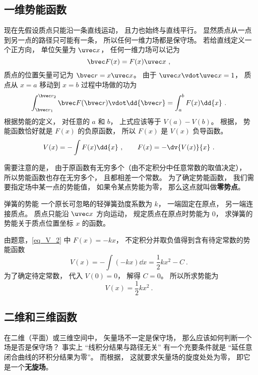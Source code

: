 \subsection{一维势能函数}

现在先假设质点只能沿一条直线运动， 且力也始终与直线平行。 显然质点从一点到另一点的路径只可能有一条， 所以任何一维力场都是保守场。 若给直线定义一个正方向， 单位矢量为 $\uvec x$， 任何一维力场可以记为
\begin{equation}\label{eq_V_2}
\bvec F(x) = F(x) \uvec x~,
\end{equation}
质点的位置矢量可记为 $\bvec r = x \uvec x$。 由于 $\uvec x \vdot \uvec x = 1$， 质点从 $x = a$ 移动到 $x=b$ 过程中场做的功为
\begin{equation}
\int_{\bvec r_1}^{\bvec r_2} \bvec F(\bvec r) \vdot \dd{\bvec r}
= \int_a^b F(x) \dd{x}~.
\end{equation}
根据势能的定义， 对任意的 $a$ 和 $b$， 上式应该等于 $V(a) - V(b)$。 根据， 势能函数恰好就是 $F(x)$ 的负原函数， 所以 $F(x)$ 是 $V(x)$ 负导函数。
\begin{equation}\label{eq_V_8}
V(x) = -\int F(x) \dd{x}~,
\qquad
F(x) = -\dv{V(x)}{x}~.
\end{equation}

需要注意的是， 由于原函数有无穷多个（由不定积分中任意常数的取值决定）， 所以势能函数也存在无穷多个， 且都相差一个常数。 为了确定势能函数， 我们需要指定场中某一点的势能值， 如果令某点势能为零， 那么这点就叫做\textbf{零势点}。

\begin{example}{弹簧的势能}
一个原长可忽略的轻弹簧劲度系数为 $k$， 一端固定在原点， 另一端连接质点。 质点只能沿 $\uvec x$ 方向运动， 规定质点在原点时势能为 $0$， 求弹簧的势能关于质点位置坐标 $x$ 的函数。 

由题意，\autoref{eq_V_2} 中 $F(x) = -kx$， 不定积分并取负值得到含有待定常数的势能函数
\begin{equation}
V(x) = -\int (-kx) \dd{x} = \frac12 k x^2 - C~.
\end{equation}
为了确定待定常数， 代入 $V(0) = 0$， 解得 $C = 0$。 所以所求势能为
\begin{equation}
V(x) =  \frac12 k x^2~.
\end{equation}
\end{example}

\subsection{二维和三维函数}
在二维（平面）或三维空间中， 矢量场不一定是保守场， 那么应该如何判断一个场是否是保守场？ 事实上 “线积分结果与路径无关” 有一个充要条件就是 “延任意闭合曲线的环积分结果为零”。 而根据， 这就要求矢量场的旋度处处为零， 即它是一个\textbf{无旋场}。

